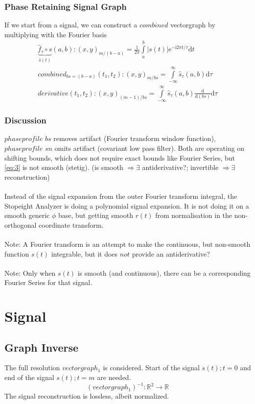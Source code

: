 \documentclass{report}
\begin{document}
\subsection{Phase Retaining Signal Graph}
If we start from a signal, we can construct a $combined$ vectorgraph by multiplying with the Fourier basis
\begin{align}
\underbrace{ \hat{f}_{\tau}\circ s}_{\hat{s}(t)}(a,b): (x,y)_{m/(b-a)} = \frac{1}{2\pi} \int\limits_{a}^{b} \lvert s(t)\rvert \mathrm{e}^{-\mathrm{i}2\pi t/\tau} \mathrm{d}t\\
combined_{bs=(b-a)}(t_{1},t_{2}): (x,y)_{m/bs} = \int \limits_{-\infty}^{\infty} \hat{s}_{\tau}(a,b) \mathrm{d}\tau\\
derivative(t_{1},t_{2}): (x,y)_{(m-1)/bs} = \int \limits_{-\infty}^{\infty} \hat{s}_{\tau}(a,b) \frac{\mathrm{d}}{\mathrm{d}(bs)} \mathrm{d}\tau
\end{align}

\subsection{Discussion}
$phaseprofile$ $bs$ removes artifact (Fourier transform window function), $phaseprofile$ $sn$ omits artifact (covariant low pass filter). Both are operating on shifting bounds, which does not require exact bounds like Fourier Series, but \eqref{eq:3} is not smooth (stetig). (is smooth $\Rightarrow \exists$ antiderivative?; invertible $\Rightarrow \exists$ reconstruction)\\\\
Instead of the signal expansion from the outer Fourier transform integral, the Stopeight Analyzer is doing a polynomial signal expansion. It is not doing it on a smooth generic $\phi$ base, but getting smooth $r(t)$ from normalisation in the non-orthogonal coordinate transform.\\\\
Note: A Fourier transform is an attempt to make the continuous, but non-smooth function $s(t)$ integrable, but it does $not$ provide an antiderivative?\\\\
Note: Only when $s(t)$ is smooth (and continuous), there can be a corresponding Fourier Series for that signal.

\chapter{Signal}
\section{Graph Inverse}
The full resolution $vectorgraph_{1}$ is considered. Start of the signal $s(t);t=0$ and end of the signal $s(t);t=m$ are needed.
\begin{equation}
(vectorgraph_{1})^{-1}: \mathbb{R}^2 \rightarrow \mathbb{R}
\end{equation}
The signal reconstruction is lossless, albeit normalized.
\end{document}
